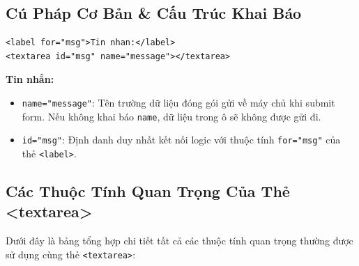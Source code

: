 \documentclass[11pt,oneside]{book}
\newcommand{\codeinline}[1]{\textcolor{accentOrange}{\texttt{#1}}}
\begin{document}
\subsection{Cú Pháp Cơ Bản \& Cấu Trúc Khai Báo}

\begin{codeWindow}
\begin{lstlisting}[language=HTML5]
<label for="msg">Tin nhan:</label>
<textarea id="msg" name="message"></textarea>
\end{lstlisting}
\end{codeWindow}

\begin{browserWindow}
\sffamily\small
\textbf{Tin nhắn:} \\[4pt]
\end{browserWindow}

\begin{tipBox}
\begin{itemize}[leftmargin=1.2em, itemsep=2pt, parsep=0pt]
    \item \codeinline{name="message"}: Tên trường dữ liệu đóng gói gửi về máy chủ khi submit form. Nếu không khai báo \codeinline{name}, dữ liệu trong ô sẽ không được gửi đi.
    \item \codeinline{id="msg"}: Định danh duy nhất kết nối logic với thuộc tính \codeinline{for="msg"} của thẻ \codeinline{<label>}.
\end{itemize}
\end{tipBox}

\subsection{Các Thuộc Tính Quan Trọng Của Thẻ <textarea>}

Dưới đây là bảng tổng hợp chi tiết tất cả các thuộc tính quan trọng thường được sử dụng cùng thẻ \codeinline{<textarea>}:
\end{document}
